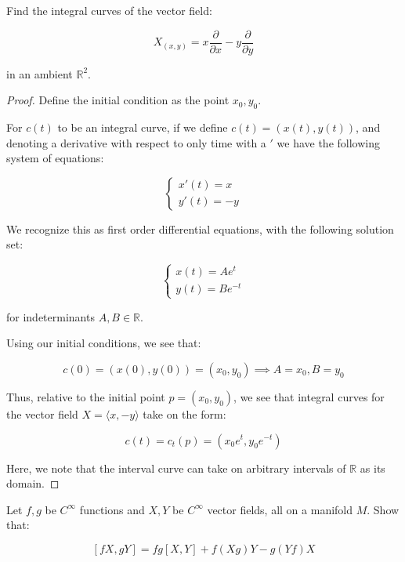 \documentclass[10pt]{article}
\newenvironment{problem}[2][]{\begin{trivlist}
\item[\hskip \labelsep {\bfseries #1}\hskip \labelsep {\bfseries #2.}]}{\end{trivlist}}
\begin{document}
\begin{problem}{Question 5}

Find the integral curves of the vector field:

$$X_{(x,y)} = x \frac{\partial}{\partial x} - y \frac{\partial}{\partial y}  $$

in an ambient $\mathbb{R}^2$.
\end{problem}


\begin{proof}

Define the initial condition as the point $x_0, y_0$.

For $c(t)$ to be an integral curve, if we define $c(t) = (x(t), y(t))$, and denoting a derivative with respect to only time with a $'$ we have the following system of equations:

$$\begin{cases} x'(t) = x \\ y'(t) = -y \end{cases}$$

We recognize this as first order differential equations, with the following solution set:

$$ \begin{cases} x(t) = Ae^{t} \\ y(t) = Be^{-t} \end{cases} $$

for indeterminants $A, B \in \mathbb{R}$.

Using our initial conditions, we see that:

$$c(0) = (x(0), y(0)) = (x_0, y_0) \implies A = x_0, B = y_0$$

Thus, relative to the initial point $p = (x_0, y_0)$, we see that integral curves for the vector field $X = \langle x, -y \rangle$ take on the form:

$$ c(t) = c_t(p) = (x_0 e^{t}, y_0 e^{-t}) $$

Here, we note that the interval curve can take on arbitrary intervals of $\mathbb{R}$ as its domain.

\end{proof}

\begin{problem}{Question 6}

Let $f, g$ be $C^\infty$ functions and $X, Y$ be $C^\infty$ vector fields, all on a manifold $M$. Show that:

$$ [fX, gY] = fg[X,Y] + f(Xg)Y - g(Yf)X$$

\end{problem}
\end{document}
